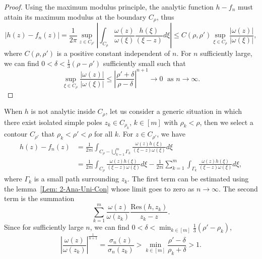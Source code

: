 \begin{proof}
    Using the maximum modulus principle, the analytic function $h - f_n$ must attain its maximum modulus at the boundary $C_{\rho}$, thus 
    \begin{equation}
        |h(z) - f_n(z)| = \frac{1}{2\pi}\sup_{z\in C_{\rho'}} \left|\int_{C_{\rho}} \frac{\omega(z)}{\omega(\xi)} \frac{h(\xi)}{(\xi - z)} d\xi\right| \le C(\rho, \rho') \sup_{\xi\in C_{\rho}} \frac{|\omega(z)|}{|\omega(\xi)|},
    \end{equation}
    where $C(\rho, \rho')$ is a positive constant independent of $n$. For $n$ sufficiently large, we can find $0 < \delta < \frac{1}{3}(\rho - \rho')$ sufficiently small such that 
    \begin{equation}
        \sup_{\xi\in C_{\rho}} \frac{|\omega(z)|}{|\omega(\xi)|} \le \left|\frac{\rho' + \delta}{\rho - \delta}\right|^{n+1} \to 0\; \text{ as }n\to \infty. 
    \end{equation}
\end{proof}
When $h$ is not analytic inside $C_{\rho}$, let us consider a generic situation in which there exist isolated simple poles $z_k\in C_{\rho_k}$, $k\in [m]$ with $\rho_k < \rho$, then we select a contour $C_{\rho'}$ that $\rho_k <\rho'<\rho$ for all $k$. For $z\in C_{\rho'}$, we have
\begin{equation}
\begin{aligned}
    h(z) - f_n(z) &= \frac{1}{2\pi i} \int_{C_{\rho} - \bigcup_{k=1}^m \Gamma_k} \frac{\omega(z)h(\xi)}{(\xi - z) \omega(\xi)} d\xi \\
    &= \frac{1}{2\pi i} \int_{C_{\rho}} \frac{\omega(z)h(\xi)}{(\xi - z) \omega(\xi)} d\xi - \frac{1}{2\pi i}\sum_{k=1}^m \int_{\Gamma_k}  \frac{\omega(z)h(\xi)}{(\xi - z) \omega(\xi)} d\xi, 
\end{aligned}
\end{equation}
where $\Gamma_k$ is a small path surrounding $z_k$. The first term can be estimated using the lemma~\ref{Lem: 2-Ana-Uni-Con} whose limit goes to zero as $n\to \infty$. The second term is the summation
\begin{equation}
    \sum_{k=1}^m \frac{\omega(z)}{\omega(z_k)}\frac{\mathrm{Res}(h, z_k)}{z_k - z}.
\end{equation}
Since for sufficiently large $n$, we can find $0<\delta<\min_{k\in[m]}\frac{1}{3}(\rho'-\rho_k)$, 
\begin{equation}
    \left|\frac{\omega(z)}{\omega(z_k)}\right|^{\frac{1}{n+1}} = \frac{\sigma_n(z)}{\sigma_n(z_k)} > \min_{k\in [m]}\frac{\rho'-\delta}{\rho_k + \delta} > 1.
\end{equation}

